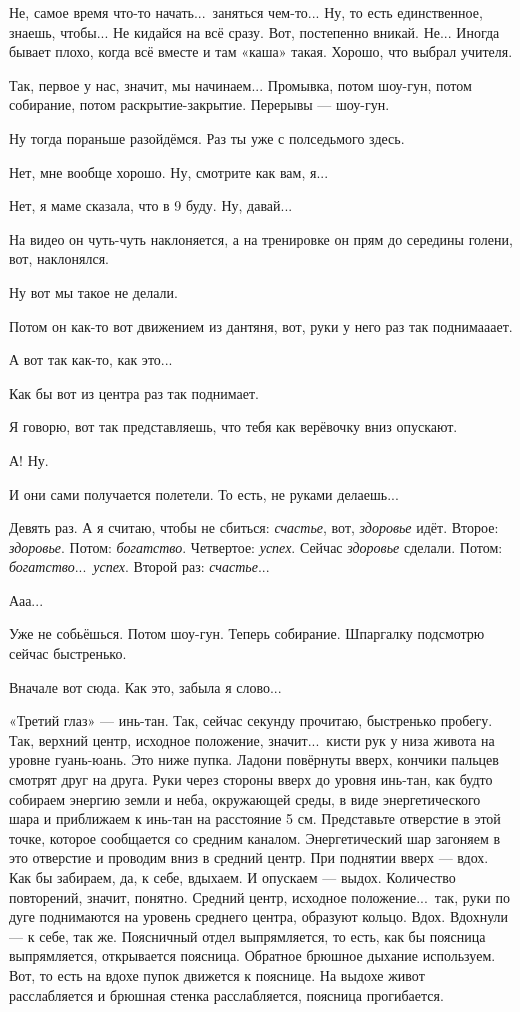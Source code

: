 \M
Не, самое время что-то начать...\ заняться чем-то...
Ну, то есть единственное, знаешь, чтобы... Не кидайся на всё сразу.
Вот, постепенно вникай. Не... Иногда
бывает плохо, когда всё вместе и там «каша» такая. Хорошо, что выбрал учителя.

\I
Так, первое у нас,
значит, мы начинаем... Промывка, потом
шоу-гун, потом собирание, потом раскрытие-закрытие. Перерывы --- шоу-гун.

\M
Ну тогда пораньше разойдёмся. Раз ты уже с полседьмого здесь.

\I
Нет, мне вообще хорошо. Ну, смотрите как вам, я...

\M
Нет, я маме сказала, что в 9 буду. Ну, давай...

\I
На видео он чуть-чуть наклоняется, а на тренировке он прям до середины голени, вот, наклонялся.

\M
Ну вот мы такое
не делали.

\I
Потом он как-то вот движением из дантяня, вот, руки у него {\csc раз} так поднимааает.

\M
А вот так как-то, как это...

\I
Как бы вот из центра {\csc раз} так поднимает.

\M
Я говорю, вот так представляешь, что тебя как верёвочку вниз опускают.

\I
А! Ну.

\M
И они сами получается полетели.
То есть, не руками делаешь...

\I
Девять раз. А я считаю, чтобы
не сбиться: {\it счастье}, вот, {\it здоровье\/} идёт. Второе: {\it здоровье}.
Потом: {\it богатство}. Четвертое:
{\it успех}.
Сейчас {\it здоровье\/} сделали. Потом: {\it богатство}...\
{\it успех}. Второй раз: {\it счастье}...

\M
Ааа...

\I
Уже не собьёшься.
Потом шоу-гун.
Теперь собирание. \hfil\break Шпаргалку подсмотрю сейчас быстренько.

\M
Вначале вот сюда. Как это, забыла я слово...

\I
«Третий глаз» --- инь-тан. Так, сейчас секунду прочитаю, быстренько пробегу.
Так, верхний центр, исходное положение, значит...\ кисти рук у низа
живота на уровне гуань-юань. Это ниже пупка.
Ладони повёрнуты вверх, кончики пальцев смотрят друг на друга.
Руки через стороны вверх до уровня инь-тан, как будто собираем энергию земли и неба,
окружающей среды, в виде энергетического шара и приближаем к инь-тан на расстояние 5 см.
Представьте отверстие в
этой точке, которое сообщается со средним каналом.
Энергетический шар загоняем в это отверстие и проводим вниз в средний центр.
При поднятии вверх --- вдох.
Как бы забираем, да, к себе, вдыхаем. И опускаем --- выдох.
Количество повторений, значит, понятно.
Средний центр, исходное положение...\ так, руки по дуге поднимаются на уровень среднего центра,
образуют кольцо. Вдох. Вдохнули --- к себе, так же.
Поясничный отдел выпрямляется, то есть, как бы поясница выпрямляется, открывается поясница.
Обратное брюшное дыхание используем.
Вот, то есть на вдохе пупок движется к пояснице.
На выдохе живот расслабляется
и брюшная стенка
расслабляется, поясница прогибается.

